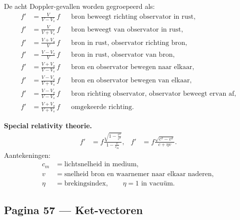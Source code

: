 \documentclass[11pt]{article}
\begin{document}
De acht Doppler-gevallen worden gegroepeerd als:
\begin{align*}
f'&=\frac{V}{V-V_s}\,f
&&\text{bron beweegt richting observator in rust},\\
f'&=\frac{V}{V+V_s}\,f
&&\text{bron beweegt van observator in rust},\\
f'&=\frac{V+V_o}{V}\,f
&&\text{bron in rust, observator richting bron},\\
f'&=\frac{V-V_o}{V}\,f
&&\text{bron in rust, observator van bron},\\
f'&=\frac{V+V_o}{V-V_s}\,f
&&\text{bron en observator bewegen naar elkaar},\\
f'&=\frac{V-V_o}{V+V_s}\,f
&&\text{bron en observator bewegen van elkaar},\\
f'&=\frac{V-V_o}{V-V_s}\,f
&&\text{bron richting observator, observator beweegt ervan af},\\
f'&=\frac{V+V_o}{V+V_s}\,f
&&\text{omgekeerde richting}.
\end{align*}

\textbf{Special relativity theorie.}
\begin{align*}
f'
&=
f\frac{\sqrt{1-\frac{v^2}{c^2}}}{1-\frac{v}{c_m}},
&
f'
&=
f\frac{\sqrt{c^2-v^2}}{c+\eta v}.
\end{align*}
Aantekeningen:
\begin{align*}
c_m&=\text{lichtsnelheid in medium},\\
v&=\text{snelheid bron en waarnemer naar elkaar naderen},\\
\eta&=\text{brekingsindex},\qquad \eta=1\text{ in vacuüm}.
\end{align*}

\subsection*{Pagina 57 --- Ket-vectoren}
\end{document}

